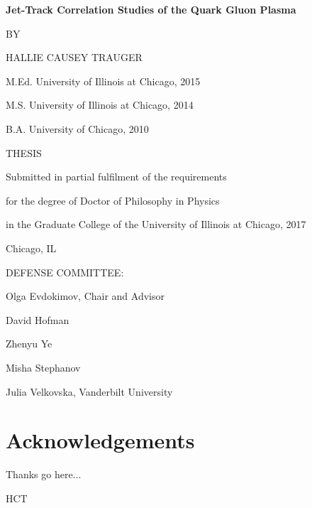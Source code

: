 \documentclass[11pt]{article}
\begin{document}
\begin{center}

\textbf{Jet-Track Correlation Studies of the Quark Gluon Plasma}



\vspace{2.5 in}
BY

HALLIE CAUSEY TRAUGER

M.Ed. University of Illinois at Chicago, 2015

M.S. University of Illinois at Chicago, 2014

B.A. University of Chicago, 2010

\vspace{2.5 in}
THESIS

Submitted in partial fulfilment of the requirements 

for the degree of Doctor of Philosophy in Physics 

in the Graduate College of the University of Illinois at Chicago, 2017

\vspace{0.2 in}
Chicago, IL

\end{center}

\vspace{0.2 in}

DEFENSE COMMITTEE:

\setlength{\parindent}{0.5in} Olga Evdokimov, Chair and Advisor

David Hofman

Zhenyu Ye

Misha Stephanov

Julia Velkovska, Vanderbilt University





\clearpage{}

\setcounter{page}{2}

\section*{Acknowledgements}

Thanks go here...

\vspace{1in}

\begin{flushright}

HCT
\end{flushright}
\clearpage{}
\end{document}
